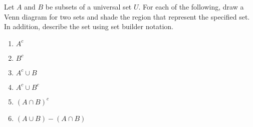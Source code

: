 \begin{previewactivity}
\newpage
\noindent
Let $A$ and $B$ be subsets of a universal set $U$.  For each of the following, draw a Venn diagram for two sets and shade the region that represent the specified set.  In addition, describe the set using set builder notation.
\begin{multicols}{3}
\begin{enumerate}
\item $A^c$
\item $B^c$
\item $A^c \cup B$
\item $A^c \cup B^c$
\item $\left( A \cap B \right)^c$
\item $\left( A \cup B \right) - \left( A \cap B \right)$
\end{enumerate}
\end{multicols}
\end{previewactivity}
\hbreak
\endinput

